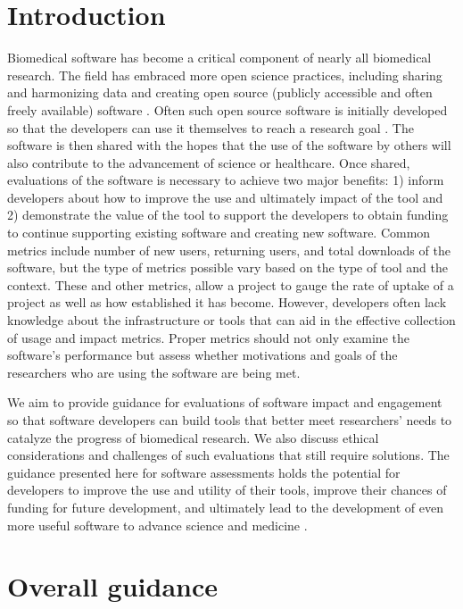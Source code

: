 \documentclass{article}
\begin{document}
\section{Introduction} Biomedical software has become a critical component of nearly all biomedical research. The field has embraced more open science practices, including sharing and harmonizing data and creating open source (publicly accessible and often freely available) software \cite{green_strategic_2020, levet_developing_2021, itcr_open-source_2021}. Often such open source software is initially developed so that the developers can use it themselves to reach a research goal \cite{bitzer_intrinsic_2007}. The software is then shared with the hopes that the use of the software by others will also contribute to the advancement of science or healthcare. Once shared, evaluations of the software is necessary to achieve two major benefits: 1) inform developers about how to improve the use and ultimately impact of the tool and 2) demonstrate the value of the tool to support the developers to obtain funding to continue supporting existing software and creating new software. Common metrics include number of new users, returning users, and total downloads of the software, but the type of metrics possible vary based on the type of tool and the context. These and other metrics, allow a project to gauge the rate of uptake of a project as well as how established it has become. However, developers often lack knowledge about the infrastructure or tools that can aid in the effective collection of usage and impact metrics. Proper metrics should not only examine the software's performance but assess whether motivations and goals of the researchers who are using the software are being met.

We aim to provide guidance for evaluations of software impact and engagement so that software developers can build tools that better meet researchers' needs to catalyze the progress of biomedical research. We also discuss ethical considerations and challenges of such evaluations that still require solutions. The guidance presented here for software assessments holds the potential for developers to improve the use and utility of their tools, improve their chances of funding for future development, and ultimately lead to the development of even more useful software to advance science and medicine \cite{wratten_reproducible_2021}. 


\section{Overall guidance}
\end{document}
